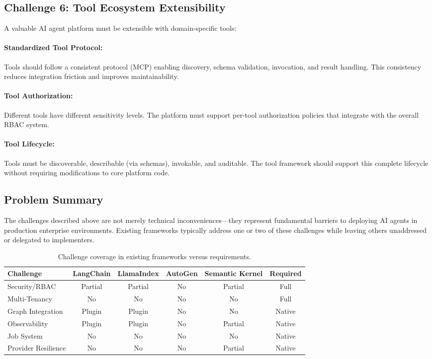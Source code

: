 \documentclass[a4paper,twoside]{sapthesis}
\begin{document}
\subsection{Challenge 6: Tool Ecosystem Extensibility}

A valuable AI agent platform must be extensible with domain-specific tools:

\paragraph{Standardized Tool Protocol:}
Tools should follow a consistent protocol (MCP) enabling discovery, schema validation, invocation, and result handling. This consistency reduces integration friction and improves maintainability.

\paragraph{Tool Authorization:}
Different tools have different sensitivity levels. The platform must support per-tool authorization policies that integrate with the overall RBAC system.

\paragraph{Tool Lifecycle:}
Tools must be discoverable, describable (via schemas), invokable, and auditable. The tool framework should support this complete lifecycle without requiring modifications to core platform code.

\subsection{Problem Summary}

The challenges described above are not merely technical inconveniences---they represent fundamental barriers to deploying AI agents in production enterprise environments. Existing frameworks typically address one or two of these challenges while leaving others unaddressed or delegated to implementers.

\begin{table}[ht]
\centering
\caption{Challenge coverage in existing frameworks versus requirements.}
\label{tab:challenge-coverage}
\small
\begin{tabular}{lccccc}
\hline
\textbf{Challenge} & \textbf{LangChain} & \textbf{LlamaIndex} & \textbf{AutoGen} & \textbf{Semantic Kernel} & \textbf{Required} \\
\midrule
Security/RBAC & Partial & Partial & No & Partial & Full \\
Multi-Tenancy & No & No & No & No & Full \\
Graph Integration & Plugin & Plugin & No & No & Native \\
Observability & Plugin & Plugin & No & Partial & Native \\
Job System & No & No & No & No & Native \\
Provider Resilience & No & No & No & Partial & Native \\
\midrule
\end{tabular}
\end{table}
\end{document}
